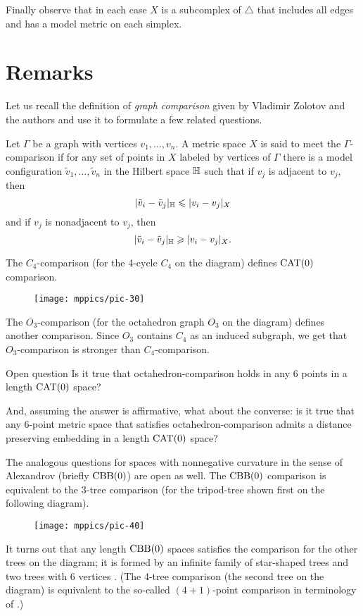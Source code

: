 \documentclass{article}
\begin{document}
Finally observe that in each case $X$ is a subcomplex of $\triangle$ that includes all edges and has a model metric on each simplex.
\qeds

\section{Remarks}

Let us recall the definition of \emph{graph comparison} given by Vladimir Zolotov and the authors \cite{lebedeva-petrunin-zolotov} and use it to formulate a few related questions.

Let $\Gamma$ be a graph with vertices $v_1,\dots,v_n$.
A metric space $X$ is said to meet the $\Gamma$-comparison if for any set of points in $X$ labeled by vertices of $\Gamma$ there is a model configuration $\tilde v_1,\dots,\tilde v_n$ in the Hilbert space $\mathbb H$ such that 
if $v_j$ is adjacent to $v_j$, then
\[|\tilde v_i-\tilde v_j|_{\mathbb H}\leqslant | v_i-v_j|_{X}\]
and
if $v_j$ is nonadjacent to $v_j$, then
\[|\tilde v_i-\tilde v_j|_{\mathbb H}\geqslant | v_i-v_j|_{X}.\]

The $C_4$-comparison (for the 4-cycle $C_4$ on the diagram) defines $\mathrm{CAT}(0)$ comparison.
\begin{figure}[h!]
\vskip-0mm
\centering
\texttt{[image: mppics/pic-30]}
\end{figure}
The $O_3$-comparison (for the octahedron graph $O_3$ on the diagram) defines another comparison.
Since $O_3$ contains $C_4$ as an induced subgraph, we get that $O_3$-comparison is stronger than $C_4$-comparison.

\begin{thm}{Open question}
Is it true that octahedron-comparison holds in any 6 points in a length $\mathrm{CAT}(0)$ space?

And, assuming the answer is affirmative, what about the converse: is it true that any 6-point metric space that satisfies octahedron-comparison admits a distance preserving embedding in a length $\mathrm{CAT}(0)$ space?
\end{thm}


The analogous questions for  spaces with nonnegative curvature in the sense of Alexandrov (briefly $\mathrm{CBB}(0)$) are open as well.
The $\mathrm{CBB}(0)$ comparison is equivalent to the $3$-tree comparison (for the tripod-tree shown first on the following diagram).
\begin{figure}[h!]
\vskip-0mm
\centering
\texttt{[image: mppics/pic-40]}
\end{figure}
It turns out that any length $\mathrm{CBB}(0)$ spaces satisfies the comparison for the other trees on the diagram; it is formed by an infinite family of star-shaped trees and two trees with 6 vertices \cite{alexander-kapovitch-petrunin-2011,lebedeva-petrunin-zolotov}.
(The 4-tree comparison (the second tree on the diagram) is equivalent to the so-called $(4{+}1)$-point comparison in terminology of \cite{alexander-kapovitch-petrunin-2011}.)
\end{document}
